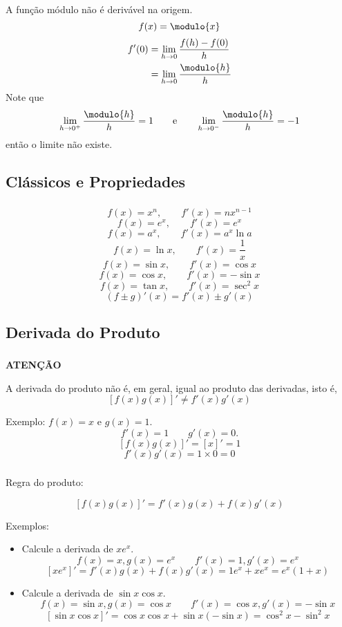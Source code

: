 \documentclass[10 pt]{beamer}
\newcommand{\myframe}[1]{
\begin{frame}
 \frametitle{\insertsection \qquad {\small \insertsubsection}}
#1
\end{frame}}
\newcommand{\limh}[1]{\lim_{h\rightarrow{#1}}}
\begin{document}
\myframe {
  A função módulo não é derivável na origem.
  $$ f(x) = \modulo{x} $$
  \vspace{0.5cm}
  \begin{align*}
    f'(0) & = \limh{0}\frac{f(h)-f(0)}{h} \\
      & = \limh{0}\frac{\modulo{h}}{h}
  \end{align*}
  Note que
    $$\limh{0^+}\frac{\modulo{h}}{h} = 1 \qquad \mbox{e} \qquad
      \limh{0^-}\frac{\modulo{h}}{h} = -1 $$
  então o limite não existe.
}

\subsection{Cl\'assicos e Propriedades}

\myframe {
  $$ f(x) = x^n, \qquad f'(x) = nx^{n-1} $$
  $$ f(x) = e^x, \qquad f'(x) = e^x $$
  $$ f(x) = a^x, \qquad f'(x) = a^x\ln a $$
  $$ f(x) = \ln x, \qquad f'(x) = \frac{1}{x} $$
  $$ f(x) = \sin x, \qquad f'(x) = \cos x $$
  $$ f(x) = \cos x, \qquad f'(x) = -\sin x $$
  $$ f(x) = \tan x, \qquad f'(x) = \sec^2 x $$
  \vspace{0.2 cm}
  $$ (f \pm g)'(x) = f'(x) \pm g'(x) $$
}

\subsection{ Derivada do Produto }

\myframe {
  \begin{center}
    {\bf ATENÇÃO}
  \end{center}
  A derivada do produto não é, em geral, igual ao produto das derivadas,
  isto é,
  $$ [f(x)g(x)]' \neq f'(x)g'(x) $$

  Exemplo: $f(x) = x$ e $g(x) = 1$.
  $$ f'(x) = 1 \qquad g'(x) = 0. $$
  $$ [f(x)g(x)]' = [x]' = 1 $$
  $$ f'(x)g'(x) = 1\times 0 = 0 $$
}

\myframe {
  Regra do produto:

  $$ [f(x)g(x)]' = f'(x)g(x) + f(x)g'(x) $$

  Exemplos: 
  \begin{itemize}
    \item Calcule a derivada de $xe^x$.
      $$ f(x) = x, g(x) = e^x \qquad f'(x) = 1, g'(x) = e^x $$
      $$ [xe^x]' = f'(x)g(x) + f(x)g'(x) = 1e^x + xe^x = e^x(1+x) $$
    \item Calcule a derivada de $\sin x \cos x$.
      $$ f(x) = \sin x, g(x) = \cos x \qquad f'(x) = \cos x, g'(x) = -\sin x$$
      $$ [\sin x\cos x]' = \cos x\cos x + \sin x(-\sin x) = \cos^2 x - \sin^2 x$$
  \end{itemize}
}
\end{document}
